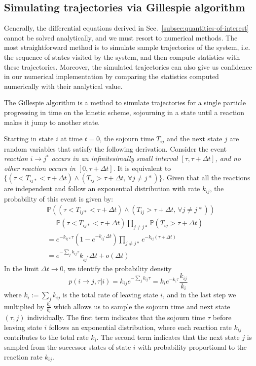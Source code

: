 \subsection{Simulating trajectories via Gillespie algorithm}
    Generally, the differential equations derived in Sec.~\ref{subsec:quantities-of-interest} cannot be solved analytically, and we must resort to numerical methods. The most straightforward method is to simulate sample trajectories of the system, i.e. the sequence of states visited by the system, and then compute statistics with these trajectories. 
    Moreover, the simulated trajectories can also give us confidence in our numerical implementation by comparing the statistics computed numerically with their analytical value.
    
    The Gillespie algorithm is a method to simulate trajectories for a single particle progressing in time on the kinetic scheme, sojourning in a state until a reaction makes it jump to another state.
    
    Starting in state $i$ at time $t=0$, the sojourn time $T_{ij}$ and the next state $j$ are random variables that satisfy the following derivation. Consider the event \emph{reaction $i\to j^*$ occurs in an infinitesimally small interval $[\tau, \tau+\Delta t]$, and no other reaction occurs in $[0, \tau+\Delta t]$}. It is equivalent to $\{(\tau < T_{ij*} < \tau + \Delta t) \wedge (T_{ij} > \tau + \Delta t \text{, } \forall j\neq j*)\}$. Given that all the reactions are independent and follow an exponential distribution with rate $k_{ij}$, the probability of this event is given by:
    \begin{equation}
    \begin{split}
        &\mathbb{P}\left((\tau < T_{ij*} < \tau + \Delta t) \wedge (T_{ij} > \tau + \Delta t \text{, } \forall j\neq j*)\right) \\
        &= \mathbb{P}(\tau < T_{ij*} < \tau + \Delta t) \prod_{j\neq j*} \mathbb{P}(T_{ij} > \tau + \Delta t) \\
        &= e^{-k_{ij*}\tau} \left(1 - e^{-k_{ij^*}\Delta t}\right) \prod_{j\neq j*} e^{-k_{ij}(\tau + \Delta t)} \\
        &= e^{-\sum_j k_{ij}\tau} k_{ij^*} \Delta t + o(\Delta t)
    \end{split}
    \end{equation}
    In the limit $\Delta t\to 0$, we identify the probability density
    \begin{equation}
        p(i\to j, \tau | i) = k_{ij} e^{-\sum_j k_{ij}\tau} = k_{i} e^{-k_{i}\tau} \frac{k_{ij}}{k_{i}}
    \end{equation}
    where $k_i := \sum_j k_{ij}$ is the total rate of leaving state $i$, and in the last step we multiplied by $\frac{k_i}{k_i}$ which allows us to sample the sojourn time and next state $(\tau, j)$ individually. The first term indicates that the sojourn time $\tau$ before leaving state $i$ follows an exponential distribution, where each reaction rate $k_{ij}$ contributes to the total rate $k_i$. The second term indicates that the next state $j$ is sampled from the successor states of state $i$ with probability proportional to the reaction rate $k_{ij}$.
    
